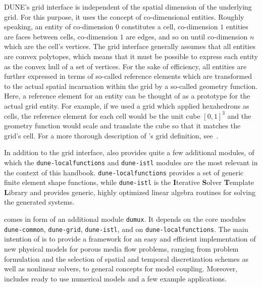DUNE's grid interface is independent of the spatial dimension of the
underlying grid. For this purpose, it uses the concept of
co-dimensional entities. Roughly speaking, an entity of co-dimension
$0$ constitutes a cell, co-dimension $1$ entities are faces between
cells, co-dimension $1$ are edges, and so on until co-dimension $n$
which are the cell's vertices.  The \Dune grid interface generally
assumes that all entities are convex polytopes, which means that it
must be possible to express each entity as the convex hull of a set of
vertices. For the sake of efficiency, all entities are further expressed in terms
of so-called reference elements which are transformed to the actual
spatial incarnation within the grid by a so-called geometry
function. Here, a reference element for an
entity can be thought of as a prototype for the actual grid
entity. For example, if we used a grid which applied hexahedrons as cells,
the reference element for each cell would be the unit cube $[0, 1]^3$
and the geometry function would scale and translate the cube so that
it matches the grid's cell. For a more thorough description of \Dune's
grid definition, see~\cite{BASTIAN2008}.

In addition to the grid interface, \Dune also provides quite a few
additional modules, of which the \texttt{dune-localfunctions} and
\texttt{dune-istl} modules are the most relevant in the context of
this handbook. \texttt{dune-localfunctions} provides a set of generic
finite element shape functions, while \texttt{dune-istl} is the
\textbf{I}terative \textbf{S}olver \textbf{T}emplate \textbf{L}ibrary
and provides generic, highly optimized linear algebra routines for
solving the generated systems.

\Dumux comes in form of an additional module \texttt{dumux}. 
It depends on the \Dune core modules 
\texttt{dune-common}, \texttt{dune-grid}, \texttt{dune-istl}, and on \texttt{dune-localfunctions}. 
The main intention of \Dumux is to provide a framework for an easy and efficient 
implementation of new physical models for porous media flow problems, 
ranging from problem formulation and the selection of 
spatial and temporal discretization schemes as well as nonlinear solvers,  
to general concepts for model coupling.  
Moreover, \Dumux includes ready to use numerical models and a few example applications.  

